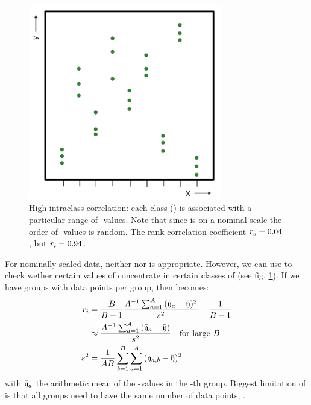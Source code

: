 \begin{refsection}
\begin{figure}
   \caption{High intraclass correlation: each class () is associated with a particular range of -values. Note that since  is on a nominal scale the order of -values is random. The rank correlation coefficient \(r_s = 0.04 \), but \(r_i = 0.94 \). }
   \label{fig:Interclass}
   \centering
      \includegraphics[width=0.75\textwidth]{Graphics/Intraclass}
\end{figure}

For nominally scaled data, neither  nor  is appropriate. However, we can use  \parencite{Har-13} to check wether certain values of  concentrate in certain classes of  (see fig. \ref{fig:Interclass}). If we have  groups with  data points per group, then  becomes:
\begin{align}
  r_i & = \frac{B}{B-1} \frac{A^{-1} \sum_{a=1}^A{(\bar{\mathfrak{y}}_a - \bar{\mathfrak{y}})^2}}{s^2} - \frac{1}{B - 1}  \\
      & \approx \frac{A^{-1} \sum_{a=1}^A{(\bar{\mathfrak{y}}_a - \bar{\mathfrak{y}})}}{s^2} \quad \mathrm{for\ large\ } B \\
  s^2 & = \frac{1}{AB} \sum_{b=1}^B{\sum_{a=1}^A{(\mathfrak{y}_{a,b} - \bar{\mathfrak{y}})^2}}
\end{align}
with \(\bar{\mathfrak{y}}_a \) the arithmetic mean of the -values in the -th group. Biggest limitation of  is that all groups need to have the same number of data points, .


\end{refsection}
